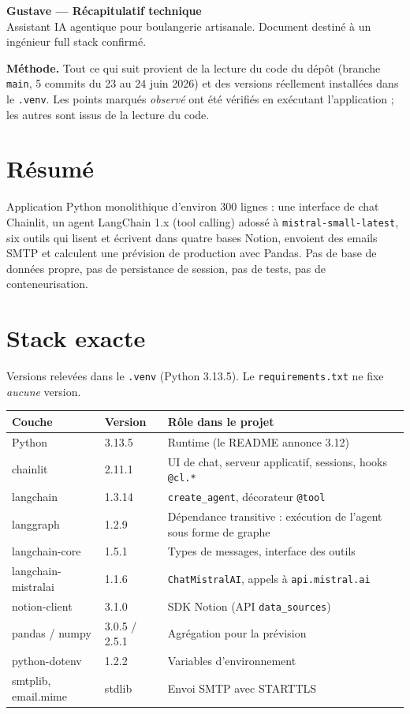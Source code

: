 \documentclass[10.5pt,a4paper]{article}
\newcommand{\code}[1]{\texttt{#1}}
\begin{document}
{\LARGE\bfseries\color{primary} Gustave --- Récapitulatif technique}\\[2pt]
{\color{muted} Assistant IA agentique pour boulangerie artisanale. Document destiné à un ingénieur full stack confirmé.}

\medskip
\textbf{Méthode.} Tout ce qui suit provient de la lecture du code du dépôt (branche \code{main}, 5 commits du 23 au 24 juin 2026) et des versions réellement installées dans le \code{.venv}. Les points marqués \textit{observé} ont été vérifiés en exécutant l'application ; les autres sont issus de la lecture du code.

\section{Résumé}
Application Python monolithique d'environ 300 lignes : une interface de chat Chainlit, un agent LangChain 1.x (tool calling) adossé à \code{mistral-small-latest}, six outils qui lisent et écrivent dans quatre bases Notion, envoient des emails SMTP et calculent une prévision de production avec Pandas. Pas de base de données propre, pas de persistance de session, pas de tests, pas de conteneurisation.

\section{Stack exacte}
Versions relevées dans le \code{.venv} (Python 3.13.5). Le \code{requirements.txt} ne fixe \emph{aucune} version.

\begin{center}\small
\begin{tabular}{@{}L{3.3cm} L{2.6cm} L{9.6cm}@{}}
\toprule
\textbf{Couche} & \textbf{Version} & \textbf{Rôle dans le projet} \\
\midrule
Python & 3.13.5 & Runtime (le README annonce 3.12) \\
chainlit & 2.11.1 & UI de chat, serveur applicatif, sessions, hooks \code{@cl.*} \\
langchain & 1.3.14 & \code{create\_agent}, décorateur \code{@tool} \\
langgraph & 1.2.9 & Dépendance transitive : exécution de l'agent sous forme de graphe \\
langchain-core & 1.5.1 & Types de messages, interface des outils \\
langchain-mistralai & 1.1.6 & \code{ChatMistralAI}, appels à \code{api.mistral.ai} \\
notion-client & 3.1.0 & SDK Notion (API \code{data\_sources}) \\
pandas / numpy & 3.0.5 / 2.5.1 & Agrégation pour la prévision \\
python-dotenv & 1.2.2 & Variables d'environnement \\
smtplib, email.mime & stdlib & Envoi SMTP avec STARTTLS \\
\bottomrule
\end{tabular}
\end{center}
\end{document}
